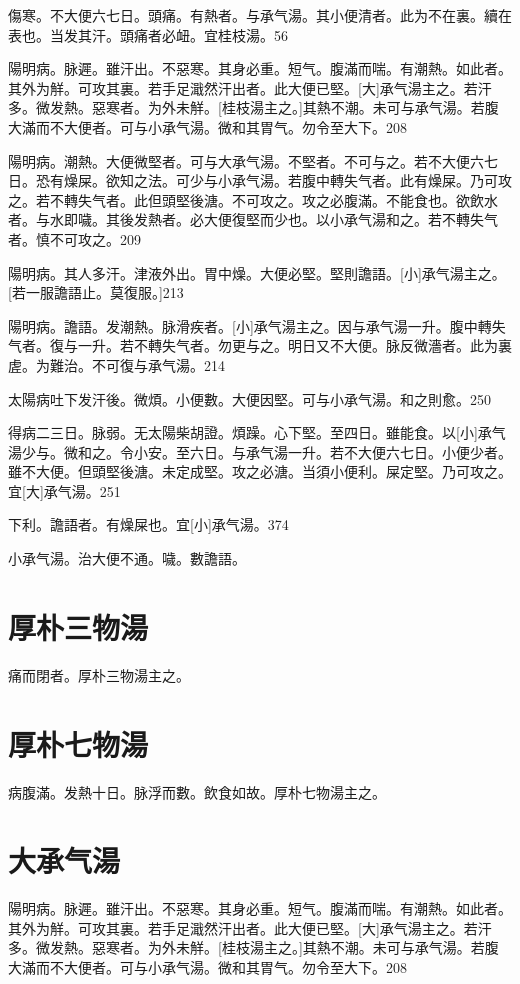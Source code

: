 \documentclass[12pt,twoside,UTF8,b5paper]{ctexbook}
\begin{document}
傷寒。不大便六七日。頭痛。有熱者。与承气湯。其小便清者。此为不在裏。續在表也。当发其汗。頭痛者必衄。宜桂枝湯。56

陽明病。脉遲。雖汗出。不惡寒。其身必重。短气。腹滿而喘。有潮熱。如此者。其外为觧。可攻其裏。若手足濈然汗出者。此大便已堅。[大]承气湯主之。若汗多。微发熱。惡寒者。为外未觧。[桂枝湯主之。]其熱不潮。未可与承气湯。若腹大滿而不大便者。可与小承气湯。微和其胃气。勿令至大下。208

陽明病。潮熱。大便微堅者。可与大承气湯。不堅者。不可与之。若不大便六七日。恐有燥屎。欲知之法。可少与小承气湯。若腹中轉失气者。此有燥屎。乃可攻之。若不轉失气者。此但頭堅後溏。不可攻之。攻之必腹滿。不能食也。欲飲水者。与水即噦。其後发熱者。必大便復堅而少也。以小承气湯和之。若不轉失气者。慎不可攻之。209

陽明病。其人多汗。津液外出。胃中燥。大便必堅。堅則譫語。[小]承气湯主之。[若一服譫語止。莫復服。]213

陽明病。譫語。发潮熱。脉滑疾者。[小]承气湯主之。因与承气湯一升。腹中轉失气者。復与一升。若不轉失气者。勿更与之。明日又不大便。脉反微濇者。此为裏虗。为難治。不可復与承气湯。214

太陽病吐下发汗後。微煩。小便數。大便因堅。可与小承气湯。和之則愈。250

得病二三日。脉弱。无太陽柴胡證。煩躁。心下堅。至四日。雖能食。以[小]承气湯少与。微和之。令小安。至六日。与承气湯一升。若不大便六七日。小便少者。雖不大便。但頭堅後溏。未定成堅。攻之必溏。当須小便利。屎定堅。乃可攻之。宜[大]承气湯。251

下利。譫語者。有燥屎也。宜[小]承气湯。374

小承气湯。治大便不通。噦。數譫語。

\section{厚朴三物湯}

痛而閉者。厚朴三物湯主之。

\section{厚朴七物湯}

病腹滿。发熱十日。脉浮而數。飲食如故。厚朴七物湯主之。

\section{大承气湯}

陽明病。脉遲。雖汗出。不惡寒。其身必重。短气。腹滿而喘。有潮熱。如此者。其外为觧。可攻其裏。若手足濈然汗出者。此大便已堅。[大]承气湯主之。若汗多。微发熱。惡寒者。为外未觧。[桂枝湯主之。]其熱不潮。未可与承气湯。若腹大滿而不大便者。可与小承气湯。微和其胃气。勿令至大下。208
\end{document}
